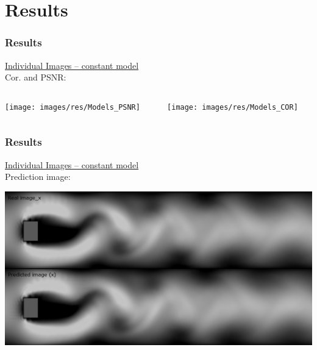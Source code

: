 \documentclass[18pt]{beamer}
\begin{document}
\section{Results}
\begin{frame}[t]
  \frametitle{Results}
  \vspace{-1cm}
  \begin{center}
    {\large \underline{Individual Images -- constant model}} \\
    Cor. and PSNR:
  \end{center}
  \vspace{-1.3cm}
  \begin{columns}[t]
    \begin{column}{0.5\textwidth}
      \begin{center}
        \texttt{[image: images/res/Models\_PSNR]}
      \end{center}
    \end{column}
    \begin{column}{0.5\textwidth}
      \begin{center}
        \texttt{[image: images/res/Models\_COR]}
      \end{center}
    \end{column}
  \end{columns}
\end{frame}

\begin{frame}[t]
  \frametitle{Results}
  \vspace{-1cm}
  \begin{center}
    {\large \underline{Individual Images -- constant model}} \\
    Prediction image:
  \end{center}

  \begin{center}
    \includegraphics[scale=0.32]{images/res/prediction}
  \end{center}  
\end{frame}
\end{document}
